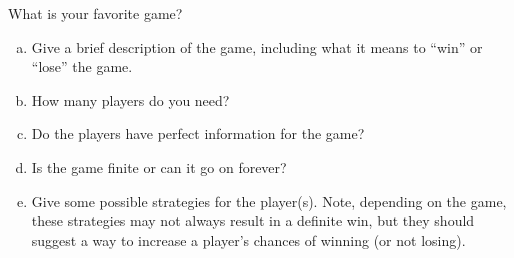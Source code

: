 
\vspace{.1in}

\begin{xca}What is your favorite game?
\begin{enumerate}[(a)]
\item Give a brief description of the game, including what it means to ``win'' or ``lose'' the game.

\item How many players do you need?

\item Do the players have perfect information for the game?

\item Is the game finite or can it go on forever?

\item Give some possible strategies for the player(s). Note, depending on the game, these strategies may not always result in a definite win, but they should suggest a way to increase a player's chances of winning (or not losing).

\end{enumerate}


\end{xca}


